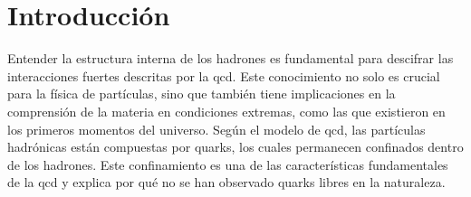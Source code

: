 \chapter*{Introducción}

\pagestyle{fancy}
\fancyhf{} %



Entender la estructura interna de los hadrones es fundamental para descifrar las interacciones fuertes descritas por la \acrfull{qcd}. Este conocimiento no solo es crucial para la física de partículas, sino que también tiene implicaciones en la comprensión de la materia en condiciones extremas, como las que existieron en los primeros momentos del universo. Según el modelo de \acrshort{qcd}, las partículas hadrónicas están compuestas por quarks, los cuales permanecen confinados dentro de los hadrones. Este confinamiento es una de las características fundamentales de la \acrshort{qcd} y explica por qué no se han observado quarks libres en la naturaleza.

\renewcommand{\figurename}{Fig.}


